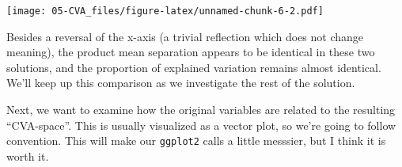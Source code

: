 \documentclass[
]{book}
\newenvironment{Shaded}{\begin{snugshade}}{\end{snugshade}}
\newcommand{\AttributeTok}[1]{\textcolor[rgb]{0.13,0.29,0.53}{#1}}
\newcommand{\CommentTok}[1]{\textcolor[rgb]{0.56,0.35,0.01}{\textit{#1}}}
\newcommand{\DecValTok}[1]{\textcolor[rgb]{0.00,0.00,0.81}{#1}}
\newcommand{\FunctionTok}[1]{\textcolor[rgb]{0.13,0.29,0.53}{\textbf{#1}}}
\newcommand{\NormalTok}[1]{#1}
\newcommand{\OtherTok}[1]{\textcolor[rgb]{0.56,0.35,0.01}{#1}}
\newcommand{\SpecialCharTok}[1]{\textcolor[rgb]{0.81,0.36,0.00}{\textbf{#1}}}
\newcommand{\StringTok}[1]{\textcolor[rgb]{0.31,0.60,0.02}{#1}}
\begin{document}
\begin{Shaded}
\end{Shaded}

\texttt{[image: 05-CVA\_files/figure-latex/unnamed-chunk-6-2.pdf]}

Besides a reversal of the x-axis (a trivial reflection which does not change meaning), the product mean separation appears to be identical in these two solutions, and the proportion of explained variation remains almost identical. We'll keep up this comparison as we investigate the rest of the solution.

Next, we want to examine how the original variables are related to the resulting ``CVA-space''. This is usually visualized as a vector plot, so we're going to follow convention. This will make our \texttt{ggplot2} calls a little messsier, but I think it is worth it.
\end{document}
